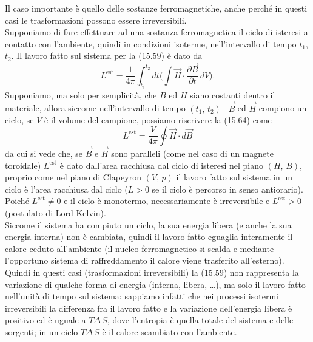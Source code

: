 Il caso importante \`e quello delle sostanze ferromagnetiche, anche perch\'e in
questi casi le trasformazioni possono essere irreversibili.\\
Supponiamo di fare effettuare ad una sostanza ferromagnetica il ciclo di
isteresi a contatto con l'ambiente, quindi in condizioni isoterme,
nell'intervallo di tempo $t_1$, $t_2$. Il lavoro fatto sul sistema per la
(15.59) \`e dato da
\begin{equation}
  L^\mathrm{est}=\frac{1}{4\pi}\int_{t_1}^{t_2}dt
  \Big(\int\vec H\cdot\frac{\partial\vec B}{\partial t}\,dV\Big).
  \tag{15.64}
\end{equation}
Supponiamo, ma solo per semplicit\`a, che $B$ ed $H$ siano costanti dentro il
materiale, allora siccome nell'intervallo di tempo $(t_1,\,t_2)$ \ $\vec B$ ed
$\vec H$ compiono un ciclo, se $V$ \`e il volume del campione, possiamo
riscrivere la (15.64) come
\begin{equation}
  L^\mathrm{est}=\frac{V}{4\pi}\oint\vec H\cdot d\vec B
  \tag{15.65}
\end{equation}
da cui si vede che, se $\vec B$ e $\vec H$ sono paralleli (come nel caso di un
magnete toroidale) $L^\mathrm{est}$ \`e dato dall'area racchiusa dal ciclo di
isteresi nel piano $(H,\,B)$, proprio come nel piano di Clapeyron $(V,\,p)$ il
lavoro fatto sul sistema in un ciclo \`e l'area racchiusa dal ciclo ($L>0$ se il
ciclo \`e percorso in senso antiorario). Poich\'e $L^\mathrm{est}\neq0$ e il
ciclo \`e monotermo, necessariamente \`e irreversibile e $L^\mathrm{est}>0$
(postulato di Lord Kelvin).\\
Siccome il sistema ha compiuto un ciclo, la sua energia libera (e anche la sua
energia interna) non \`e cambiata, quindi il lavoro fatto eguaglia interamente
il calore ceduto all'ambiente (il nucleo ferromagnetico si scalda e mediante
l'opportuno sistema di raffreddamento il calore viene trasferito all'esterno).\\
Quindi in questi casi (trasformazioni irreversibili) la (15.59) non rappresenta
la variazione di qualche forma di energia (interna, libera, \dots), ma solo il
lavoro fatto nell'unit\`a di tempo sul sistema: sappiamo infatti che nei
processi isotermi irreversibili la differenza fra il lavoro fatto e la
variazione dell'energia libera \`e positivo ed \`e uguale a $T\Delta\,S$, dove
l'entropia \`e quella totale del sistema e delle sorgenti; in un ciclo
$T\Delta\,S$ \`e il calore scambiato con l'ambiente.
